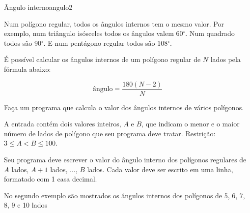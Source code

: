\documentclass[12pt,a4paper,oneside]{article}
\begin{document}
\begin{problem}{Ângulo interno}{angulo}{2}

Num polígono regular, todos os ângulos internos tem o mesmo valor. Por exemplo, num triângulo isósceles todos os ângulos valem 60$^{\circ}$. Num quadrado todos são 90$^{\circ}$. E num pentágono regular todos são 108$^{\circ}$.

É possível calcular os ângulos internos de um polígono regular de $N$ lados pela fórmula abaixo:

$$\text{ângulo} = \frac{180(N-2)}{N}$$

Faça um programa que calcula o valor dos ângulos internos de vários polígonos.


%

\InputFile

A entrada contém dois valores inteiros, $A$ e $B$, que indicam o menor e o maior número de lados de polígono que seu programa deve tratar. Restrição: $3 \leq A < B \leq 100$.

\OutputFile

Seu programa deve escrever o valor do ângulo interno dos polígonos regulares de $A$ lados, $A+1$ lados, $\dots$, $B$ lados. Cada valor deve ser escrito em uma linha, formatado com 1 casa decimal.


\Example

\begin{example}
%
\end{example}

\begin{example}
%
\end{example}


\small
No segundo exemplo são mostrados os ângulos internos dos polígonos de 5, 6, 7, 8, 9 e 10 lados

\end{problem}
\end{document}
